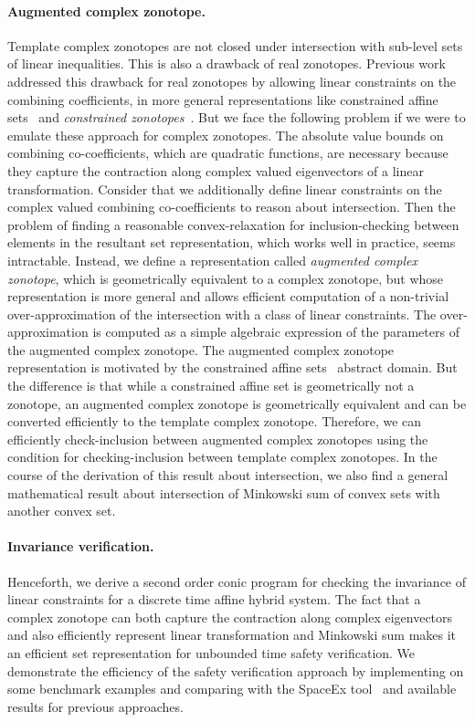 \documentclass[11pt,a4paper,twoside,openright]{article}
\begin{document}
\paragraph{Augmented complex zonotope.}  Template complex
zonotopes are not closed under intersection with sub-level sets of
linear inequalities.  This is also a drawback of real zonotopes.
Previous work addressed this drawback for real zonotopes by allowing
linear constraints on the combining coefficients, in more general
representations like constrained affine sets~\cite{Ghorbal2010} and
{\it constrained zonotopes}~\cite{scott2016constrained}.  But we face
the following problem if we were to emulate these approach for complex
zonotopes.  The absolute value bounds on combining co-coefficients,
which are quadratic functions, are necessary because they capture the
contraction along complex valued eigenvectors of a linear
transformation.  Consider that we additionally define linear
constraints on the complex valued combining co-coefficients to reason
about intersection.  Then the problem of finding a reasonable
convex-relaxation for inclusion-checking between elements in the
resultant set representation, which works well in practice, seems
intractable.  Instead, we define a representation called {\it
  augmented complex zonotope}, which is geometrically equivalent to a
complex zonotope, but whose representation is more general and allows
efficient computation of a non-trivial over-approximation of the
intersection with a class of linear constraints.  The
over-approximation is computed as a simple algebraic expression of the
parameters of the augmented complex zonotope.  The augmented complex
zonotope representation is motivated by the constrained affine
sets~\cite{Ghorbal2010} abstract domain.  But the difference is that
while a constrained affine set is geometrically not a zonotope, an
augmented complex zonotope is geometrically equivalent and can be
converted efficiently to the template complex zonotope.  Therefore, we
can efficiently check-inclusion between augmented complex zonotopes
using the condition for checking-inclusion between template complex
zonotopes.  In the course of the derivation of this result about
intersection, we also find a general mathematical result about
intersection of Minkowski sum of convex sets with another convex set.

\paragraph{Invariance verification.}
Henceforth, we derive a second order conic program for checking the
invariance of linear constraints for a discrete time affine hybrid
system.  The fact that a complex zonotope can both capture the
contraction along complex eigenvectors and also efficiently represent
linear transformation and Minkowski sum makes it an efficient set
representation for unbounded time safety verification.  We demonstrate
the efficiency of the safety verification approach by implementing on
some benchmark examples and comparing with the SpaceEx
tool~\cite{FLD+11} and available results for previous approaches.
\end{document}
